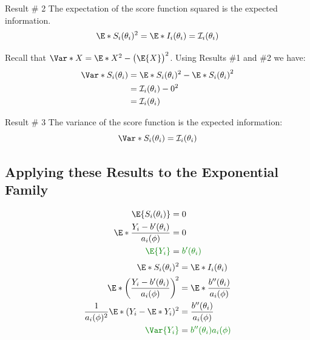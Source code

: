 \documentclass[oneside]{book}\usepackage[]{graphicx}\usepackage[svgnames]{xcolor}
\begin{document}
\begin{Result}{Result \# 2}
      The expectation of the score function squared is the expected information.
      \[  \E*{S_i(\theta_i)^2}=\E*{I_i(\theta_i)}=\mathcal{I}_i(\theta_i) \]
\end{Result}
Recall that $ \Var*{X}=\E*{X^2}-\bigl(\E{X}\bigr)^2 $. Using Results \#1 and \#2 we have:
\begin{align*}
      \Var*{S_i(\theta_i)} & =\E*{S_i(\theta_i)^2}-\E*{S_i(\theta_i)}^2 \\
                           & =\mathcal{I}_i(\theta_i)-0^2               \\
                           & =\mathcal{I}_i(\theta_i)
\end{align*}
\begin{Result}{Result \# 3}
      The variance of the score function is the expected information:
      \[ \Var*{S_i(\theta_i)}=\mathcal{I}_i(\theta_i) \]
\end{Result}
\subsection*{Applying these Results to the Exponential Family}
\begin{align*}
      \E{S_i(\theta_i)}                             & =0                                     \\
      \E*{\frac{Y_i-b^\prime(\theta_i)}{a_i(\phi)}} & =0                                     \\
      \textcolor{Green}{\E{Y_i}}                    & =\textcolor{Green}{b^\prime(\theta_i)} \\
\end{align*}
\begin{align*}
      \E*{S_i(\theta_i)^2}                                              & =\E*{I_i(\theta_i)}                                      \\
      \E*{\biggl(\frac{Y_i-b^\prime(\theta_i)}{a_i(\phi)}\biggr)^{\!2}} & =\E*{\frac{b^{\prime\prime}(\theta_i)}{a_i(\phi)}}       \\
      \frac{1}{a_i(\phi)^2}\E*{(Y_i-\E*{Y_i})^2}                        & = \frac{b^{\prime\prime}(\theta_i)}{a_i(\phi)}           \\
      \textcolor{Green}{\Var{Y_i}}                                      & = \textcolor{Green}{b^{\prime\prime}(\theta_i)a_i(\phi)}
\end{align*}
\end{document}
